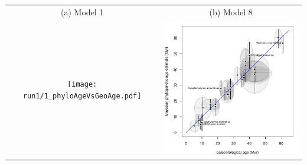 \documentclass{standalone}
\begin{document}
\begin{tabular}{cc}
(a) Model 1 & (b) Model 8 \\
\texttt{[image: run1/1\_phyloAgeVsGeoAge.pdf]} 
& 
\includegraphics[width=7cm]{run8_5/8_phyloAgeVsGeoAge.pdf}
\\
\end{tabular}
\end{document}
